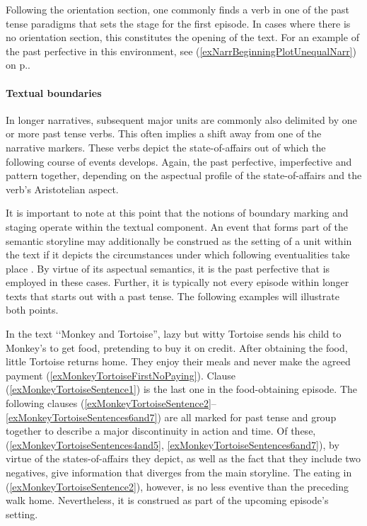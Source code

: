 Following the orientation section, one commonly finds a verb in one of the past tense paradigms that sets the stage for the first episode. In cases where there is no orientation section, this constitutes the opening of the text. For an example of the past perfective in this environment, see (\ref{exNarrBeginningPlotUnequalNarr}) on p.\nobreakspace\pageref{exNarrBeginningPlotUnequalNarr}.

\paragraph{Textual boundaries}\label{PastPFVNarrativeDiscourseBoundaries}
In longer narratives, subsequent major units are commonly also delimited by one or more past tense verbs. This often implies a shift away from one of the narrative markers. These verbs depict the state-of-affairs out of which the following course of events develops. Again, the past perfective, imperfective and  pattern together, depending on the aspectual profile of the state-of-affairs and the verb's Aristotelian aspect.

It is important to note at this point that the notions of boundary marking and staging operate within the textual component. An event that forms part of the semantic storyline may additionally be construed as the setting of a unit within the text if it depicts the circumstances under which following eventualities take place \citep{PayneD1992}. By virtue of its aspectual semantics, it is the past perfective that is employed in these cases. Further, it is typically not every episode within longer texts that starts out with a past tense. The following examples will illustrate both points.

In the text \lq\lq Monkey and Tortoise'', lazy but witty Tortoise sends his child to Monkey's to get food, pretending to buy it on credit. After obtaining the food, little Tortoise returns home. They enjoy their meals and never make the agreed payment (\ref{exMonkeyTortoiseFirstNoPaying}). Clause (\ref{exMonkeyTortoiseSentence1}) is the last one in the food-obtaining episode. The following clauses (\ref{exMonkeyTortoiseSentence2}--\ref{exMonkeyTortoiseSentences6and7}) are all marked for past tense and group together to describe a major discontinuity in action and time. Of these, (\ref{exMonkeyTortoiseSentences4and5}, \ref{exMonkeyTortoiseSentences6and7}), by virtue of the states-of-affairs they depict, as well as the fact that they include two negatives, give information that diverges from the main storyline. The eating in (\ref{exMonkeyTortoiseSentence2}), however, is no less eventive than the preceding walk home. Nevertheless, it is construed as part of the upcoming episode's setting.

